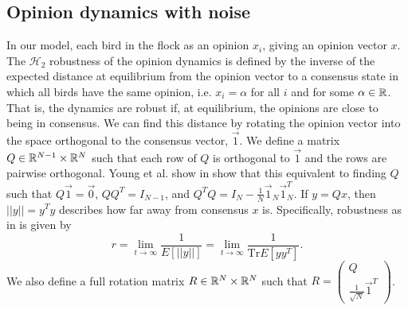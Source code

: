 \documentclass{article}
\newcommand{\Tr}{\text{Tr}}
\begin{document}
\subsection{Opinion dynamics with noise }
In our model, each bird in the flock as an opinion $x_i$, giving an opinion vector $x$. The $\mathscr{H}_2$ robustness of the opinion dynamics is defined by the inverse of the expected distance at equilibrium from the opinion vector to a consensus state in which all birds have the same opinion, i.e. $x_i=\alpha$ for all $i$ and for some $\alpha\in{\mathbb{R}}$. That is, the dynamics are robust if, at equilibrium, the opinions are close to being in consensus. We can find this distance by rotating the opinion vector into the space orthogonal to the consensus vector, $\vec{1}$. We define a matrix $Q\in{\mathbb{R}}^{N-1}\times{\mathbb{R}}^N$ such that each row of $Q$ is orthogonal to $\vec{1}$ and the rows are pairwise orthogonal. Young et al. show in \cite{Young:2010fk} show that this equivalent to finding $Q$ such that $Q\vec{1}=\vec{0}$, $QQ^T=I_{N-1}$, and $Q^TQ=I_N-\frac{1}{N}\vec{1}_N\vec{1}_N^T$.  If $y=Qx$, then $||y||=y^Ty$ describes how far away from consensus $x$ is. Specifically, robustness as in \cite{Young:2010fk} is given by 
\begin{equation}
r=\lim_{t\to\infty}\frac{1}{E[||y||]}=\lim_{t\to\infty}\frac{1}{\Tr E[yy^T]}. \label{H2_robustness}
\end{equation}
We also define a full rotation matrix $R\in{\mathbb{R}}^N\times{\mathbb{R}}^N$ such that $R=\left(\begin{array}{cc} Q \\ \frac{1}{\sqrt{N}}\vec{1}^T \end{array}\right)$.
\end{document}
